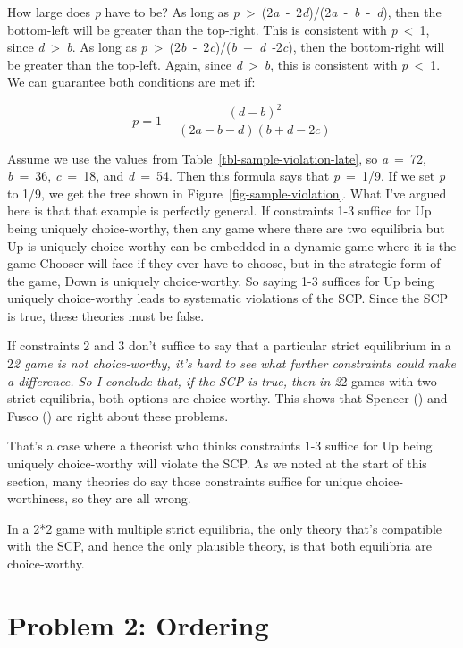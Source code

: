 \documentclass[
  11pt,
  letterpaper,
  DIV=11,
  numbers=noendperiod,
  twoside]{scrartcl}
\begin{document}
How large does \emph{p} have to be? As long as
\emph{p}~\textgreater~(2\emph{a}~‑~2\emph{d})/(2\emph{a}~‑~\emph{b}~‑~\emph{d}),
then the bottom-left will be greater than the top-right. This is
consistent with \emph{p}~\textless~1, since
\emph{d}~\textgreater~\emph{b}. As long as
\emph{p}~\textgreater~(2\emph{b}~‑~2\emph{c})/(\emph{b}~+~\emph{d}~‑2\emph{c}),
then the bottom-right will be greater than the top-left. Again, since
\emph{d}~\textgreater~\emph{b}, this is consistent with
\emph{p}~\textless~1. We can guarantee both conditions are met if:

\[
p = 1 - \frac{(d-b)^2}{(2a-b-d)(b+d-2c)}
\]

Assume we use the values from Table~\ref{tbl-sample-violation-late}, so
\emph{a}~=~72, \emph{b}~=~36, \emph{c}~=~18, and \emph{d}~=~54. Then
this formula says that \emph{p}~=~1/9. If we set \emph{p} to 1/9, we get
the tree shown in Figure~\ref{fig-sample-violation}. What I've argued
here is that that example is perfectly general. If constraints 1-3
suffice for Up being uniquely choice-worthy, then any game where there
are two equilibria but Up is uniquely choice-worthy can be embedded in a
dynamic game where it is the game Chooser will face if they ever have to
choose, but in the strategic form of the game, Down is uniquely
choice-worthy. So saying 1-3 suffices for Up being uniquely
choice-worthy leads to systematic violations of the SCP. Since the SCP
is true, these theories must be false.

If constraints 2 and 3 don't suffice to say that a particular strict
equilibrium in a 2\emph{2 game is not choice-worthy, it's hard to see
what further constraints could make a difference. So I conclude that, if
the SCP is true, then in 2}2 games with two strict equilibria, both
options are choice-worthy. This shows that Spencer
() and Fusco
() are right about these problems.

That's a case where a theorist who thinks constraints 1-3 suffice for Up
being uniquely choice-worthy will violate the SCP. As we noted at the
start of this section, many theories do say those constraints suffice
for unique choice-worthiness, so they are all wrong.

In a 2*2 game with multiple strict equilibria, the only theory that's
compatible with the SCP, and hence the only plausible theory, is that
both equilibria are choice-worthy.

\section{Problem 2: Ordering}\label{sec-ordering}
\end{document}
